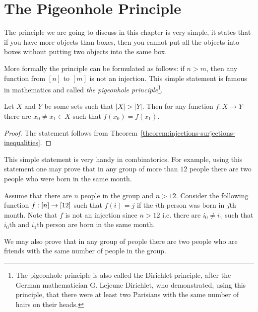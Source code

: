 \chapter{The Pigeonhole Principle}
\label{chapter:pigeonhole}

The principle we are going to discuss in this chapter is very simple, it states
that if you have more objects than boxes, then you cannot put all the objects into
boxes without putting two objects into the same box.

More formally the principle can be formulated as follows: if $n > m$, then any
function from $[n]$ to $[m]$ is not an injection. This simple statement is
famous in mathematics and called \emph{the pigeonhole principle}\footnote{%
  The pigeonhole principle is also called the Dirichlet principle, after the
  German mathematician G. Lejeune Dirichlet, who demonstrated, using this
  principle, that there were at least two Parisians with the same number of
  hairs on their heads.
}.

\begin{theorem}
  Let $X$ and $Y$ be some sets such that $|X| > |Y|$. Then for any function
  $f : X \to Y$ there are $x_0 \neq x_1 \in X$ such that $f(x_0) = f(x_1)$.
\end{theorem}
\begin{proof}
  The statement follows from
  Theorem~\ref{theorem:injections-surjections-inequalities}.
\end{proof}

This simple statement is very handy in combinatorics. For example, using this
statement one may prove that in any group of more than $12$ people there are
two people who were born in the same month.

Assume that there are $n$ people in the group and $n > 12$.
Consider the following function $f : {[{n}]} \to [12]$ such that $f(i) = j$ if the
$i$th person was born in $j$th month. Note that $f$ is not an injection since
$n > 12$ i.e. there are $i_0 \neq i_1$ such that $i_0$th and $i_1$th person are
born in the same month.

We may also prove that in any group of people there are two people who are
friends with the same number of people in the group.

